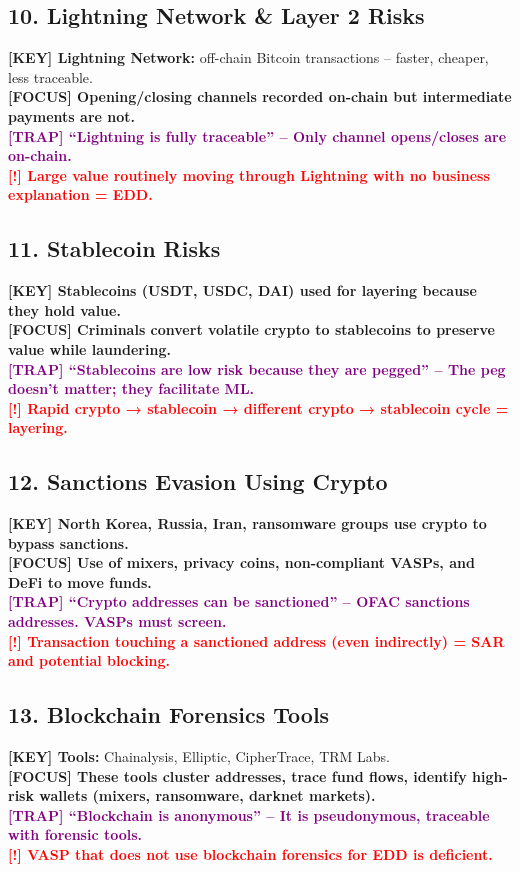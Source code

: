 \documentclass[10pt,a4paper]{article}
\newcommand{\redflag}[1]{\textcolor{red}{\textbf{[!] #1}}}
\newcommand{\examfocus}[1]{\textcolor{orange!80!black}{\textbf{[FOCUS] #1}}}
\newcommand{\trap}[1]{\textcolor{purple}{\textbf{[TRAP] #1}}}
\newcommand{\keyterm}[1]{\textcolor{red!80!black}{\textbf{[KEY] #1}}}
\begin{document}
\subsection*{10. Lightning Network \& Layer 2 Risks}
\keyterm{Lightning Network:} off-chain Bitcoin transactions – faster, cheaper, less traceable. \\
\examfocus{Opening/closing channels recorded on-chain but intermediate payments are not.} \\
\trap{“Lightning is fully traceable” – Only channel opens/closes are on-chain.} \\
\redflag{Large value routinely moving through Lightning with no business explanation = EDD.}

\subsection*{11. Stablecoin Risks}
\keyterm{Stablecoins (USDT, USDC, DAI) used for layering because they hold value.} \\
\examfocus{Criminals convert volatile crypto to stablecoins to preserve value while laundering.} \\
\trap{“Stablecoins are low risk because they are pegged” – The peg doesn't matter; they facilitate ML.} \\
\redflag{Rapid crypto → stablecoin → different crypto → stablecoin cycle = layering.}

\subsection*{12. Sanctions Evasion Using Crypto}
\keyterm{North Korea, Russia, Iran, ransomware groups use crypto to bypass sanctions.} \\
\examfocus{Use of mixers, privacy coins, non-compliant VASPs, and DeFi to move funds.} \\
\trap{“Crypto addresses can be sanctioned” – OFAC sanctions addresses. VASPs must screen.} \\
\redflag{Transaction touching a sanctioned address (even indirectly) = SAR and potential blocking.}

\subsection*{13. Blockchain Forensics Tools}
\keyterm{Tools:} Chainalysis, Elliptic, CipherTrace, TRM Labs. \\
\examfocus{These tools cluster addresses, trace fund flows, identify high-risk wallets (mixers, ransomware, darknet markets).} \\
\trap{“Blockchain is anonymous” – It is pseudonymous, traceable with forensic tools.} \\
\redflag{VASP that does not use blockchain forensics for EDD is deficient.}
\end{document}
